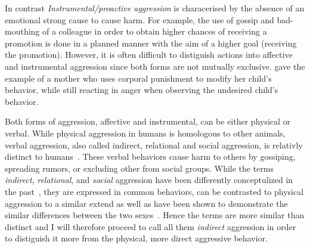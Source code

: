 In contrast \textit{Instrumental/proactive aggression} is characerised by the absence of an emotional strong cause to cause harm.
For example, the use of gossip and bad-mouthing of a colleague in order to obtain higher chances of receiving a promotion is done in a planned manner with the aim of a higher goal (receiving the promotion).
However, it is often difficult to distiguish actions into affective and instrumental aggression since both forms are not mutually exclusive.
\citet{Geen2001} gave the example of a mother who uses corporal punishment to modify her child's behavior, while still reacting in anger when observing the undesired child's behavior.

Both forms of aggression, affective and instrumental, can be either physical or verbal.
While physical aggression in humans is homologous to other animals, verbal aggression, also called indirect, relational and social aggression, is relativly distinct to humans~\cite{Archer2005}.
These verbal behaviors cause harm to others by gossiping, spreading rumors, or excluding other from social groups.
While the terms \textit{indirect}, \textit{relational}, and \textit{social} aggression have been differently conceptulized in the past~\cite{Archer2001}, they are expressed in common behaviors, can be contrasted to physical aggression to a similar extend as well as have been shown to demonstrate the similar differences between the two sexes~\cite{Archer2004}.
Hence the terms are more similar than distinct and I will therefore proceed to call all them \textit{indirect} aggression in order to distiguish it more from the physical, more direct aggressive behavior\cite{Archer2005}.

